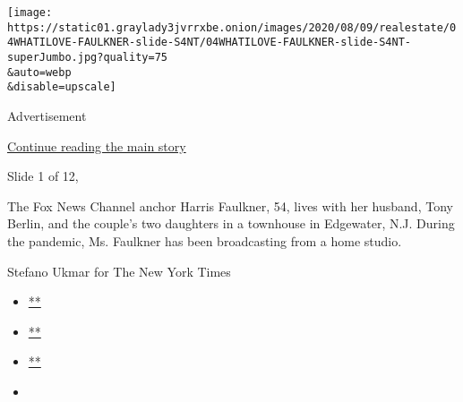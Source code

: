 \texttt{[image: https://static01.graylady3jvrrxbe.onion/images/2020/08/09/realestate/04WHATILOVE-FAULKNER-slide-S4NT/04WHATILOVE-FAULKNER-slide-S4NT-superJumbo.jpg?quality=75\\\&auto=webp\\\&disable=upscale]}

Advertisement

\protect\hyperlink{after-right-0}{Continue reading the main story}

Slide 1 of 12,

The Fox News Channel anchor Harris Faulkner, 54, lives with her husband,
Tony Berlin, and the couple's two daughters in a townhouse in Edgewater,
N.J. During the pandemic, Ms. Faulkner has been broadcasting from a home
studio.

Stefano Ukmar for The New York Times

\begin{itemize}
\item
  \href{https://www.facebookcorewwwi.onion/sharer.php?app_id=9869919170\&u=https\%3A\%2F\%2Fwww.nytimes3xbfgragh.onion\%2Fslideshow\%2F2020\%2F08\%2F04\%2Frealestate\%2Fthings-dont-have-to-be-matchy-matchy-and-other-design-tips-from-harris-faulkners-mom.html\%3Fsmid\%3Dfb-share\&name=\%E2\%80\%98Things\%20Don\%E2\%80\%99t\%20Have\%20to\%20Be\%20Matchy-Matchy\%E2\%80\%99\%20and\%20Other\%20Design\%20Tips\%20From\%20Harris\%20Faulkner\%E2\%80\%99s\%20Mom\&redirect_uri=https\%3A\%2F\%2Fwww.facebookcorewwwi.onion\%2F}{**}
\item
  \href{https://twitter.com/intent/tweet?url=https\%3A\%2F\%2Fwww.nytimes3xbfgragh.onion\%2Fslideshow\%2F2020\%2F08\%2F04\%2Frealestate\%2Fthings-dont-have-to-be-matchy-matchy-and-other-design-tips-from-harris-faulkners-mom.html\%3Fsmid\%3Dtw-share\&text=\%E2\%80\%98Things\%20Don\%E2\%80\%99t\%20Have\%20to\%20Be\%20Matchy-Matchy\%E2\%80\%99\%20and\%20Other\%20Design\%20Tips\%20From\%20Harris\%20Faulkner\%E2\%80\%99s\%20Mom}{**}
\item
  \href{mailto:?subject=nytimes3xbfgragh.onion\%3A\%20\%E2\%80\%98Things\%20Don\%E2\%80\%99t\%20Have\%20to\%20Be\%20Matchy-Matchy\%E2\%80\%99\%20and\%20Other\%20Design\%20Tips\%20From\%20Harris\%20Faulkner\%E2\%80\%99s\%20Mom\&body=From\%20The\%20New\%20York\%20Times\%3A\%0A\%0A\%E2\%80\%98Things\%20Don\%E2\%80\%99t\%20Have\%20to\%20Be\%20Matchy-Matchy\%E2\%80\%99\%20and\%20Other\%20Design\%20Tips\%20From\%20Harris\%20Faulkner\%E2\%80\%99s\%20Mom\%0A\%0AThe\%20Fox\%20News\%20anchor\%E2\%80\%99s\%20mother\%20gave\%20her\%20some\%20decorating\%20advice\%3A\%20\%E2\%80\%98Just\%20make\%20it\%20beautiful.\%E2\%80\%99\%20And\%20she\%E2\%80\%99s\%20been\%20trying.\%0A\%0Ahttps\%3A\%2F\%2Fwww.nytimes3xbfgragh.onion\%2Fslideshow\%2F2020\%2F08\%2F04\%2Frealestate\%2Fthings-dont-have-to-be-matchy-matchy-and-other-design-tips-from-harris-faulkners-mom.html\%3Fsmid\%3Dem-share}{**}
\item
\end{itemize}

